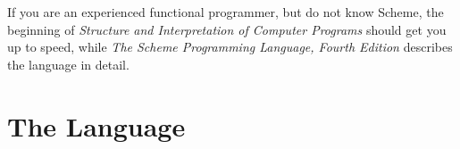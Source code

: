 If you are an experienced functional programmer, but do not know
 Scheme, the beginning of \emph{Structure and Interpretation
  of Computer Programs} should get you up to speed, while \emph{The Scheme Programming Language, Fourth
  Edition}\cite{Dybvig:2009:SPL:1618542} describes the language in detail.









\section{The Language}\label{sec:preface:language}

